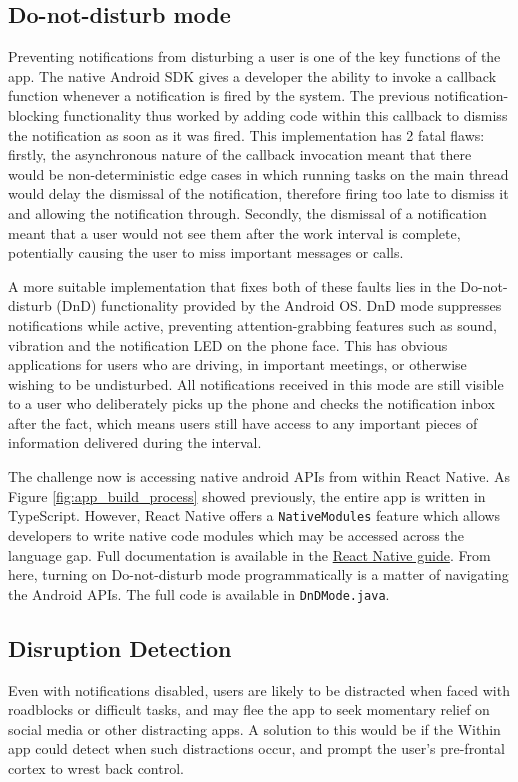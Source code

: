 \subsection{Do-not-disturb mode}
Preventing notifications from disturbing a user is one of the key functions of the app. The native Android SDK gives a developer the ability to invoke a callback function whenever a notification is fired by the system. The previous notification-blocking functionality thus worked by adding code within this callback to dismiss the notification as soon as it was fired. This implementation has 2 fatal flaws: firstly, the asynchronous nature of the callback invocation meant that there would be non-deterministic edge cases in which running tasks on the main thread would delay the dismissal of the notification, therefore firing too late to dismiss it and allowing the notification through. Secondly, the dismissal of a notification meant that a user would not see them after the work interval is complete, potentially causing the user to miss important messages or calls.

A more suitable implementation that fixes both of these faults lies in the Do-not-disturb (DnD) functionality provided by the Android OS. DnD mode suppresses notifications while active, preventing attention-grabbing features such as sound, vibration and the notification LED on the phone face. This has obvious applications for users who are driving, in important meetings, or otherwise wishing to be undisturbed. All notifications received in this mode are still visible to a user who deliberately picks up the phone and checks the notification inbox after the fact, which means users still have access to any important pieces of information delivered during the interval.

The challenge now is accessing native android APIs from within React Native. As Figure \ref{fig:app_build_process} showed previously, the entire app is written in TypeScript. However, React Native offers a \texttt{NativeModules} feature which allows developers to write native code modules which may be accessed across the language gap. Full documentation is available in the \href{https://reactnative.dev/docs/native-modules-intro}{React Native guide}. From here, turning on Do-not-disturb mode programmatically is a matter of navigating the Android APIs. The full code is available in \texttt{DnDMode.java}.


\subsection{Disruption Detection}
Even with notifications disabled, users are likely to be distracted when faced with roadblocks or difficult tasks, and may flee the app to seek momentary relief on social media or other distracting apps. A solution to this would be if the Within app could detect when such distractions occur, and prompt the user's pre-frontal cortex to wrest back control.


